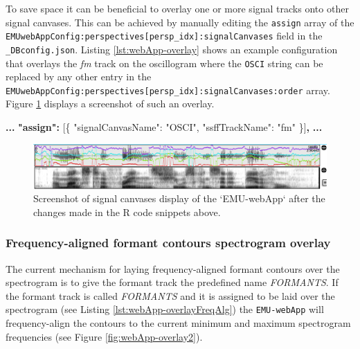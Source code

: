 \documentclass[]{book}
\newenvironment{Shaded}{\begin{snugshade}}{\end{snugshade}}
\newcommand{\DataTypeTok}[1]{\textcolor[rgb]{0.13,0.29,0.53}{#1}}
\newcommand{\ErrorTok}[1]{\textcolor[rgb]{0.64,0.00,0.00}{\textbf{#1}}}
\newcommand{\FunctionTok}[1]{\textcolor[rgb]{0.00,0.00,0.00}{#1}}
\newcommand{\OtherTok}[1]{\textcolor[rgb]{0.56,0.35,0.01}{#1}}
\newcommand{\StringTok}[1]{\textcolor[rgb]{0.31,0.60,0.02}{#1}}
\theoremstyle{definition}
\theoremstyle{definition}
\theoremstyle{definition}
\theoremstyle{remark}
\begin{document}
To save space it can be beneficial to overlay one or more signal tracks
onto other signal canvases. This can be achieved by manually editing the
\texttt{assign} array of the
\texttt{EMUwebAppConfig:perspectives{[}persp\_idx{]}:signalCanvases}
field in the \texttt{\_DBconfig.json}. Listing \ref{lst:webApp-overlay}
shows an example configuration that overlays the \emph{fm} track on the
oscillogram where the \texttt{OSCI} string can be replaced by any other
entry in the
\texttt{EMUwebAppConfig:perspectives{[}persp\_idx{]}:signalCanvases:order}
array. Figure \ref{fig:webApp-overlay1} displays a screenshot of such an
overlay.

\begin{Shaded}
\begin{Highlighting}[]
\ErrorTok{...}
\ErrorTok{"assign":} \OtherTok{[}\FunctionTok{\{}
    \DataTypeTok{"signalCanvasName"}\FunctionTok{:} \StringTok{"OSCI"}\FunctionTok{,}
    \DataTypeTok{"ssffTrackName"}\FunctionTok{:} \StringTok{"fm"}
\FunctionTok{\}}\OtherTok{]}\ErrorTok{,}
\ErrorTok{...}
\end{Highlighting}
\end{Shaded}

\begin{figure}

{\centering \includegraphics[width=1\linewidth]{pics/emu-webAppOverlay} 

}

\caption{Screenshot of signal canvases display of the `EMU-webApp` after the changes made in the R code snippets above.}\label{fig:webApp-overlay1}
\end{figure}

\hypertarget{subsubsec:emu-webAppFreqAlignedFormants}{%
\subsubsection{Frequency-aligned formant contours spectrogram
overlay}\label{subsubsec:emu-webAppFreqAlignedFormants}}

The current mechanism for laying frequency-aligned formant contours over
the spectrogram is to give the formant track the predefined name
\emph{FORMANTS}. If the formant track is called \emph{FORMANTS} and it
is assigned to be laid over the spectrogram (see Listing
\ref{lst:webApp-overlayFreqAlg}) the \texttt{EMU-webApp} will
frequency-align the contours to the current minimum and maximum
spectrogram frequencies (see Figure \ref{fig:webApp-overlay2}).
\end{document}
